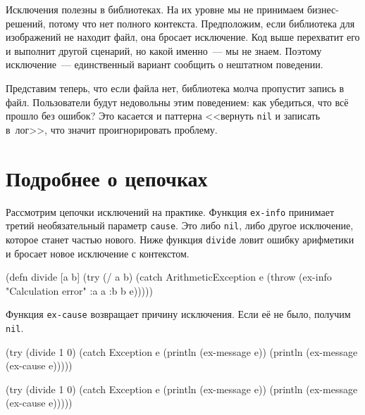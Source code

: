 \fi

Исключения полезны в библиотеках. На их уровне мы не принимаем бизнес-решений,
потому что нет полного контекста. Предположим, если библиотека для изображений
не находит файл, она бросает исключение. Код выше перехватит его и выполнит
другой сценарий, но какой именно~--- мы не знаем. Поэтому исключение~---
единственный вариант сообщить о нештатном поведении.

Представим теперь, что если файла нет, библиотека молча пропустит запись в
файл. Пользователи будут недовольны этим поведением: как убедиться, что всё
прошло без ошибок? Это касается и паттерна <<вернуть \verb|nil| и записать
в~лог>>, что значит проигнорировать проблему.

\section{Подробнее о цепочках}


Рассмотрим цепочки исключений на практике. Функция \verb|ex-info|
принимает третий необязательный параметр \verb|cause|. Это либо \verb|nil|,
либо другое исключение, которое станет частью нового. Ниже функция
\verb|divide| ловит ошибку арифметики и бросает новое исключение с контекстом.


\label{re-throw-example}

\begin{english}
  \begin{clojure}
(defn divide [a b]
  (try
    (/ a b)
    (catch ArithmeticException e
      (throw (ex-info
               "Calculation error"
               {:a a :b b}
               e)))))
  \end{clojure}
\end{english}

Функция \verb|ex-cause| возвращает причину исключения. Если её не было,
получим \verb|nil|.

\ifx\DEVICETYPE\MOBILE

\begin{english}
  \begin{clojure}
(try
  (divide 1 0)
  (catch Exception e
    (println (ex-message e))
    (println (ex-message
               (ex-cause e)))))
  \end{clojure}
\end{english}

\else

\begin{english}
  \begin{clojure}
(try
  (divide 1 0)
  (catch Exception e
    (println (ex-message e))
    (println (ex-message (ex-cause e)))))
  \end{clojure}
\end{english}

